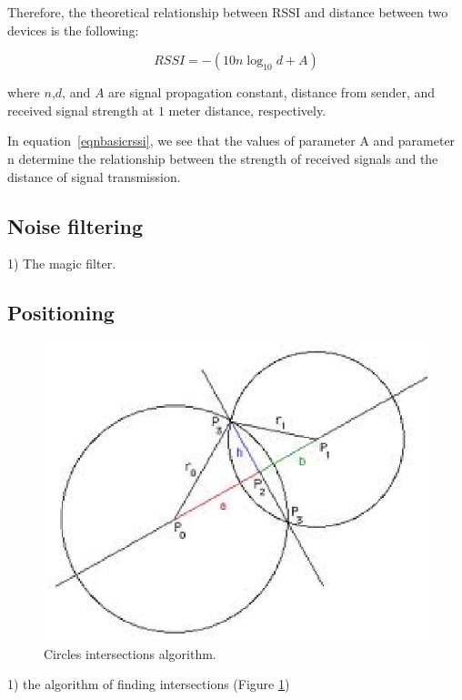 \documentclass[conference,a4paper]{../../sty/IEEEtran}
\begin{document}
Therefore, the theoretical relationship between RSSI and distance between two devices is the following: \cite{chung2007enhanced}

\begin{equation}
  RSSI = -(10n \log_{10}d + A)
 \label{eqnbasicrssi}
\end{equation}

where $n$,$d$, and $A$ are signal propagation constant, distance from sender, and received signal strength at $1$ meter distance, respectively.

In equation~\ref{eqnbasicrssi}, we see that the values of parameter A and parameter n determine the relationship between the strength of received signals and the distance of signal transmission.

\subsection{Noise filtering}

1) The magic filter.

\subsection{Positioning}

\begin{figure}[h!]
\centering
\includegraphics[scale=0.7]{intr.eps}
\caption{Circles intersections algorithm.\cite{cshint}}
\label{fig2}
\end{figure}

1) the algorithm of finding intersections (Figure \ref{fig2})\cite{cshint}
\end{document}
